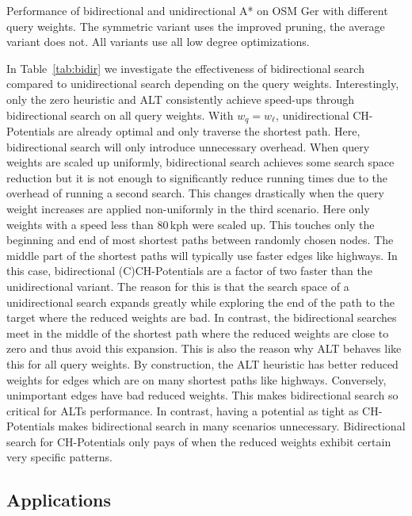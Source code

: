 \documentclass[manuscript,review]{acmart}
\begin{document}
\begin{table}
\centering
\caption{
Performance of bidirectional and unidirectional A* on OSM Ger with different query weights.
The symmetric variant uses the improved pruning, the average variant does not.
All variants use all low degree optimizations.
}\label{tab:bidir}

\end{table}

In Table~\ref{tab:bidir} we investigate the effectiveness of bidirectional search compared to unidirectional search depending on the query weights.
Interestingly, only the zero heuristic and ALT consistently achieve speed-ups through bidirectional search on all query weights.
With $w_q = w_{\ell}$, unidirectional CH-Potentials are already optimal and only traverse the shortest path.
Here, bidirectional search will only introduce unnecessary overhead.
When query weights are scaled up uniformly, bidirectional search achieves some search space reduction but it is not enough to significantly reduce running times due to the overhead of running a second search.
This changes drastically when the query weight increases are applied non-uniformly in the third scenario.
Here only weights with a speed less than 80\,kph were scaled up.
This touches only the beginning and end of most shortest paths between randomly chosen nodes.
The middle part of the shortest paths will typically use faster edges like highways.
In this case, bidirectional (C)CH-Potentials are a factor of two faster than the unidirectional variant.
The reason for this is that the search space of a unidirectional search expands greatly while exploring the end of the path to the target where the reduced weights are bad.
In contrast, the bidirectional searches meet in the middle of the shortest path where the reduced weights are close to zero and thus avoid this expansion.
This is also the reason why ALT behaves like this for all query weights.
By construction, the ALT heuristic has better reduced weights for edges which are on many shortest paths like highways.
Conversely, unimportant edges have bad reduced weights.
This makes bidirectional search so critical for ALTs performance.
In contrast, having a potential as tight as CH-Potentials makes bidirectional search in many scenarios unnecessary.
Bidirectional search for CH-Potentials only pays of when the reduced weights exhibit certain very specific patterns.

\subsection{Applications}
\end{document}
